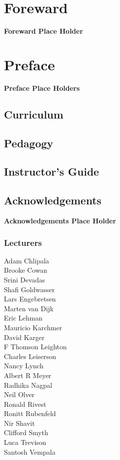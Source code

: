 \chapter*{Foreward}

\textbf{Foreward Place Holder}

\chapter*{Preface}

\textbf{Preface Place Holders}

\section*{Curriculum}

\section*{Pedagogy}

\section*{Instructor's Guide}

\section*{Acknowledgements}

\textbf{Acknowledgements Place Holder}

\subsection*{Lecturers}

Adam Chlipala\\
Brooke Cowan\\
Srini Devadas\\
Shafi Goldwasser\\
Lars Engebretsen\\
Marten van Dijk\\
Eric Lehman\\
Mauricio Karchmer\\
David Karger\\
F Thomson Leighton\\
Charles Leiserson\\
Nancy Lynch\\
Albert R Meyer\\
Radhika Nagpal\\
Neil Olver\\
Ronald Rivest\\
Ronitt Rubenfeld\\
Nir Shavit\\
Clifford Smyth\\
Luca Trevison\\
Santosh Vempala

